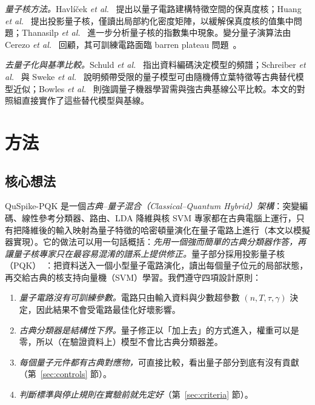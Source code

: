 \documentclass[10pt,a4paper]{article}
\begin{document}
\textit{量子核方法。}Havlí\v{c}ek \textit{et al.}~\cite{havlicek2019} 提出以量子電路建構特徵空間的保真度核；Huang \textit{et al.}~\cite{huang2021power} 提出投影量子核，僅讀出局部約化密度矩陣，以緩解保真度核的值集中問題；Thanasilp \textit{et al.}~\cite{thanasilp2024concentration} 進一步分析量子核的指數集中現象。變分量子演算法由 Cerezo \textit{et al.}~\cite{cerezo2021vqa} 回顧，其可訓練電路面臨 barren plateau 問題~\cite{mcclean2018barren}。

\textit{去量子化與基準比較。}Schuld \textit{et al.}~\cite{schuld2021effect} 指出資料編碼決定模型的頻譜；Schreiber \textit{et al.}~\cite{schreiber2023surrogates} 與 Sweke \textit{et al.}~\cite{sweke2023rff} 說明頻帶受限的量子模型可由隨機傅立葉特徵等古典替代模型近似；Bowles \textit{et al.}~\cite{bowles2024better} 則強調量子機器學習需與強古典基線公平比較。本文的對照組直接實作了這些替代模型與基線。

\section{方法}
\label{sec:method}

\subsection{核心想法}
\label{sec:formulation}

QuSpike-PQK 是一個\emph{古典--量子混合（Classical--Quantum Hybrid）架構}：突變編碼、線性參考分類器、路由、LDA 降維與核 SVM 專家都在古典電腦上運行，只有把降維後的輸入映射為量子特徵的哈密頓量演化在量子電路上進行（本文以模擬器實現）。它的做法可以用一句話概括：\emph{先用一個強而簡單的古典分類器作答，再讓量子核專家只在最容易混淆的譜系上提供修正。}量子部分採用投影量子核（PQK）~\cite{huang2021power}：把資料送入一個小型量子電路演化，讀出每個量子位元的局部狀態，再交給古典的核支持向量機（SVM）學習。我們遵守四項設計原則：
\begin{enumerate}[label=P\arabic*)]
    \item \textit{量子電路沒有可訓練參數。}電路只由輸入資料與少數超參數 $(n,T,\tau,\gamma)$ 決定，因此結果不會受電路最佳化好壞影響。
    \item \textit{古典分類器是結構性下界。}量子修正以「加上去」的方式進入，權重可以是零，所以（在驗證資料上）模型不會比古典分類器差。
    \item \textit{每個量子元件都有古典對應物，}可直接比較，看出量子部分到底有沒有貢獻（第~\ref{sec:controls} 節）。
    \item \textit{判斷標準與停止規則在實驗前就先定好}（第~\ref{sec:criteria} 節）。
\end{enumerate}
\end{document}
